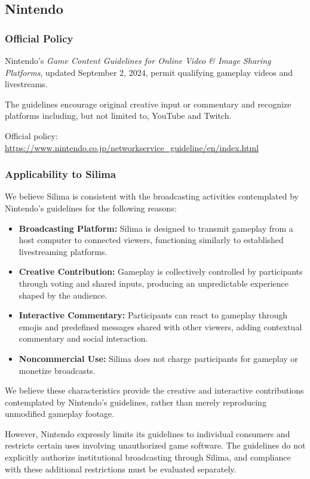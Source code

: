 \subsection{Nintendo}

\subsubsection{Official Policy}

Nintendo's \textit{Game Content Guidelines for Online Video
\& Image Sharing Platforms}, updated September 2, 2024,
permit qualifying gameplay videos and livestreams.

The guidelines encourage original creative input or
commentary and recognize platforms including, but not
limited to, YouTube and Twitch.

Official policy:
\url{https://www.nintendo.co.jp/networkservice_guideline/en/index.html}

\subsubsection{Applicability to Silima}

We believe Silima is consistent with the broadcasting
activities contemplated by Nintendo's guidelines for
the following reasons:

\begin{itemize}
    \item \textbf{Broadcasting Platform:}
    Silima is designed to transmit gameplay from a host
    computer to connected viewers, functioning similarly
    to established livestreaming platforms.

    \item \textbf{Creative Contribution:}
    Gameplay is collectively controlled by participants
    through voting and shared inputs, producing an
    unpredictable experience shaped by the audience.

    \item \textbf{Interactive Commentary:}
    Participants can react to gameplay through emojis
    and predefined messages shared with other viewers,
    adding contextual commentary and social interaction.

    \item \textbf{Noncommercial Use:}
    Silima does not charge participants for gameplay
    or monetize broadcasts.
\end{itemize}

We believe these characteristics provide the creative
and interactive contributions contemplated by Nintendo's
guidelines, rather than merely reproducing unmodified
gameplay footage.

However, Nintendo expressly limits its guidelines to
individual consumers and restricts certain uses involving
unauthorized game software. The guidelines do not
explicitly authorize institutional broadcasting through
Silima, and compliance with these additional restrictions
must be evaluated separately.
